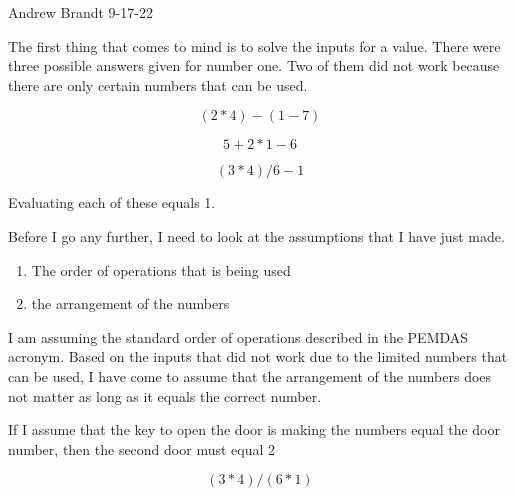 \documentclass[12pt]{article}
\begin{document}
\noindent
Andrew Brandt
9-17-22

\vspace{5mm}

\Large\noindent
The first thing that comes to mind is to solve the inputs for a value.
There were three possible answers given for number one. Two of them did not work because there are only certain numbers that can be used.

\[(2*4)-(1-7)\]

\[5+2*1-6\]

\[(3*4)/6-1\]

\vspace{5mm}

\noindent Evaluating each of these equals 1.

\vspace{5mm}

\noindent Before I go any further, I need to look at the assumptions that I have just made.

\begin{enumerate}
    \item The order of operations that is being used
    \item the arrangement of the numbers
\end{enumerate}

\vspace{5mm}

\noindent I am assuming the standard order of operations described in the PEMDAS acronym. Based on the inputs that did not work due to the limited numbers that can be used,
I have come to assume that the arrangement of the numbers does not matter as long as it equals the correct number.

\noindent If I assume that the key to open the door is making the numbers equal the door number, then the second door must equal 2

\[(3*4)/(6*1)\]
\end{document}
